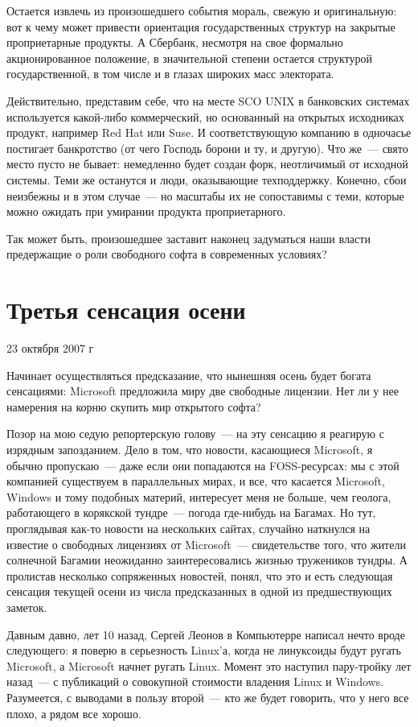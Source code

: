 Остается извлечь из произошедшего события мораль, свежую и оригинальную: вот к чему может привести ориентация государственных структур на закрытые проприетарные продукты. А Сбербанк, несмотря на свое формально акционированное положение, в значительной степени остается структурой государственной, в том числе и в глазах широких масс электората.

Действительно, представим себе, что на месте SCO UNIX в банковских системах используется какой-либо коммерческий, но основанный на открытых исходниках продукт, например Red Hat или Suse. И соответствующую компанию в одночасье постигает банкротство (от чего Господь борони и ту, и другую). Что же~--- свято место пусто не бывает: немедленно будет создан форк, неотличимый от исходной системы. Теми же останутся и люди, оказывающие техподдержку. Конечно, сбои неизбежны и в этом случае~--- но масштабы их не сопоставимы с теми, которые можно ожидать при умирании продукта проприетарного.

Так может быть, произошедшее заставит наконец задуматься наши власти предержащие о роли свободного софта в современных условиях?

\section{Третья сенсация осени} 
\begin{timeline}23 октября 2007 г\end{timeline}
Начинает осуществляться предсказание, что нынешняя осень будет богата сенсациями: Microsoft предложила миру две свободные лицензии. Нет ли у нее намерения на корню скупить мир открытого софта?

Позор на мою седую репортерскую голову~--- на эту сенсацию я реагирую с изрядным запозданием. Дело в том, что новости, касающиеся Microsoft, я обычно пропускаю~--- даже если они попадаются на FOSS-ресурсах: мы с этой компанией существуем в параллельных мирах, и все, что касается Microsoft, Windows и тому подобных материй, интересует меня не больше, чем геолога, работающего в корякской тундре~--- погода где-нибудь на Багамах. Но тут, проглядывая как-то новости на нескольких сайтах, случайно наткнулся на известие о свободных лицензиях от Microsoft~--- свидетельстве того, что жители солнечной Багамии неожиданно заинтересовались жизнью тружеников тундры. А пролистав несколько сопряженных новостей, понял, что это и есть следующая сенсация текущей осени из числа предсказанных в одной из предшествующих заметок.

Давным давно, лет 10 назад, Сергей Леонов в Компьютерре написал нечто вроде следующего: я поверю в серьезность Linux'а, когда не линуксоиды будут ругать Microsoft, а Microsoft начнет ругать Linux. Момент это наступил пару-тройку лет назад~--- с публикаций о совокупной стоимости владения Linux и Windows. Разумеется, с выводами в пользу второй~--- кто же будет говорить, что у него все плохо, а рядом все хорошо.

